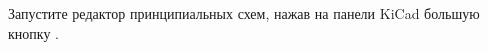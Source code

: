 

Запустите редактор принципиальных схем, нажав на панели KiCad большую кнопку
\icoesch.


% 
% 
% 

